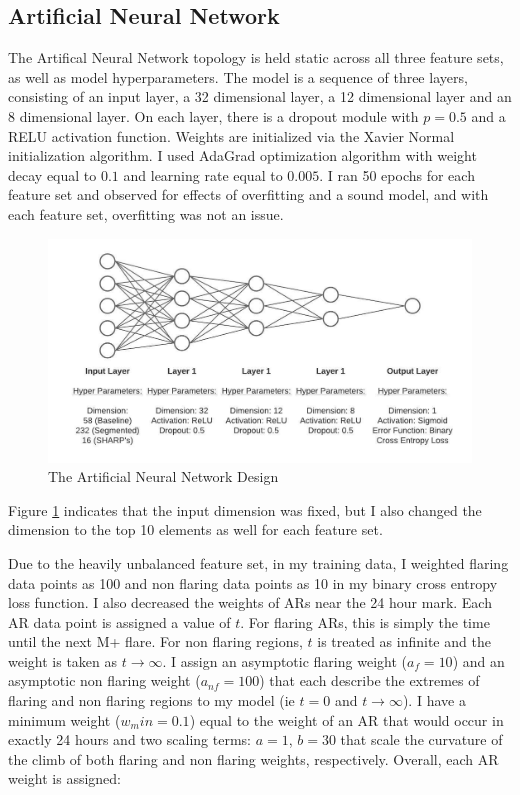 \subsection{Artificial Neural Network}
The Artifical Neural Network topology is held static across all three feature sets, as well as model hyperparameters. The model is a sequence of three layers, consisting of an input layer, a 32 dimensional layer, a 12 dimensional layer and an 8 dimensional layer. On each layer, there is a dropout module with $p = 0.5$ and a RELU activation function. Weights are initialized via the Xavier Normal initialization algorithm. I used AdaGrad optimization algorithm with weight decay equal to $0.1$ and learning rate equal to $0.005$. I ran 50 epochs for each feature set and observed for effects of overfitting and a sound model, and with each feature set, overfitting was not an issue. 
\begin{figure}[h]
    \centering
    \includegraphics[width=\linewidth]{ThesisFilePkg/figures/methods/ann.jpeg}
    \caption{The Artificial Neural Network Design}
    \label{fig:ann}
\end{figure}

Figure \ref{fig:ann} indicates that the input dimension was fixed, but I also changed the dimension to the top 10 elements as well for each feature set.

Due to the heavily unbalanced feature set, in my training data, I weighted flaring data points as 100 and non flaring data points as 10 in my binary cross entropy loss function. I also decreased the weights of ARs near the 24 hour mark. Each AR data point is assigned a value of $t$. For flaring ARs, this is simply the time until the next M+ flare. For non flaring regions, $t$ is treated as infinite and the weight is taken as $t \rightarrow \infty$. I assign an asymptotic flaring weight ($a_f = 10$) and an asymptotic non flaring weight ($a_{nf} = 100$) that each describe the extremes of flaring and non flaring regions to my model (ie $t = 0$ and $t \rightarrow \infty$). I have a minimum weight ($w_min = 0.1$) equal to the weight of an AR that would occur in exactly 24 hours and two scaling terms: $a = 1$, $b = 30$ that scale the curvature of the climb of both flaring and non flaring weights, respectively. Overall, each AR weight is assigned:  

